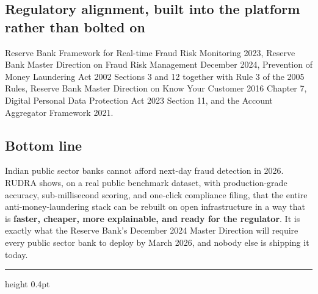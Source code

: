 \documentclass[10pt,a4paper]{article}
\begin{document}
\subsection*{Regulatory alignment, built into the platform rather than bolted on}
Reserve Bank Framework for Real-time Fraud Risk Monitoring 2023, Reserve Bank Master Direction on Fraud Risk Management December 2024, Prevention of Money Laundering Act 2002 Sections 3 and 12 together with Rule 3 of the 2005 Rules, Reserve Bank Master Direction on Know Your Customer 2016 Chapter 7, Digital Personal Data Protection Act 2023 Section 11, and the Account Aggregator Framework 2021.

\subsection*{Bottom line}
\noindent
\colorbox{ink!7}{
\parbox{0.985\columnwidth}{\color{ink}
\small
Indian public sector banks cannot afford next-day fraud detection in 2026. RUDRA shows, on a real public benchmark dataset, with production-grade accuracy, sub-millisecond scoring, and one-click compliance filing, that the entire anti-money-laundering stack can be rebuilt on open infrastructure in a way that is \textbf{faster, cheaper, more explainable, and ready for the regulator}. It is exactly what the Reserve Bank's December 2024 Master Direction will require every public sector bank to deploy by March 2026, and nobody else is shipping it today.
}}

\vspace{4pt}
\hrule height 0.4pt
\vspace{2pt}
\end{document}
